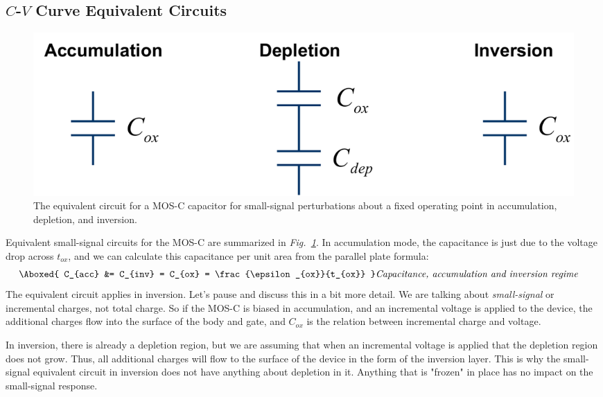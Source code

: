 \subsection{\texorpdfstring{$C$-$V$}{C-V} Curve Equivalent Circuits}
\begin{figure}[tbh]
\centering
\includegraphics[width=\columnwidth]{mos_cv_circuits}
\caption{The equivalent circuit for a MOS-C capacitor for small-signal perturbations about a fixed operating point in accumulation, depletion, and inversion.}
\label{fig:mos_cv_circuits}
\end{figure}
Equivalent small-signal circuits for the MOS-C are summarized in \emph{Fig.~\ref{fig:mos_cv_circuits}}.  In accumulation mode, the capacitance is just due to the voltage drop across $t_{ox}$, and we can calculate this capacitance per unit area from the parallel plate formula:
    \begin{align}
        \Aboxed{ C_{acc} &= C_{inv} = C_{ox} = \frac{\epsilon_{ox}}{t_{ox}} } &\textit{Capacitance, accumulation and inversion regime}
    \end{align}
The equivalent circuit applies in inversion.  Let's pause and discuss this in a bit more detail.  We are talking about \emph{small-signal} or incremental charges, not total charge.  So if the MOS-C is biased in accumulation, and an incremental voltage is applied to the device, the additional charges flow into the surface of the body and gate, and $C_{ox}$ is the relation between incremental charge and voltage.

In inversion, there is already a depletion region, but we are assuming that when an incremental voltage is applied that the depletion region does not grow.  Thus, all additional charges will flow to the surface of the device in the form of the inversion layer. This is why the small-signal equivalent circuit in inversion does not have anything about depletion in it.  Anything that is "frozen" in place has no impact on the small-signal response.

